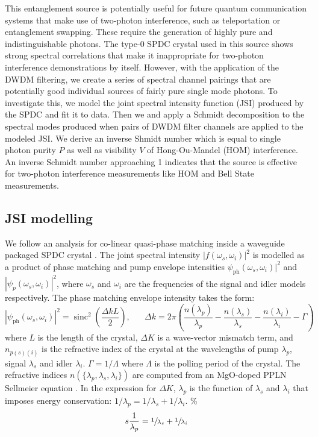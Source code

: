 \documentclass[11pt]{caltech_thesis} %
\begin{document}
This entanglement source is potentially useful for future quantum communication systems that make use of two-photon interference, such as teleportation or entanglement swapping. These require the generation of highly pure and indistinguishable photons. The type-0 SPDC crystal used in this source shows strong spectral correlations that make it inappropriate for two-photon interference demonstrations by itself. However, with the application of the DWDM filtering, we create a series of spectral channel pairings that are potentially good individual sources of fairly pure single mode photons. To investigate this, we model the joint spectral intensity function (JSI) produced by the SPDC and fit it to data. Then we and apply a Schmidt decomposition to the spectral modes produced when pairs of DWDM filter channels are applied to the modeled JSI. We derive an inverse Shmidt number which is equal to single photon purity $P$ as well as visibility $V$ of Hong-Ou-Mandel (HOM) interference. An inverse Schmidt number approaching 1 indicates that the source is effective for two-photon interference measurements like HOM and Bell State measurements.

\hypertarget{jsi-modelling}{%
\subsection{JSI modelling}\label{jsi-modelling}}

We follow an analysis for co-linear quasi-phase matching inside a waveguide packaged SPDC crystal \cite{Davis2022, ZielnickiKwiat2018SPDCmodel}. The joint spectral intensity $|f(\omega_s, \omega_i)|^2$ is modelled as a product of phase matching and pump envelope intensities \textbar{}$\psi_{\mathrm{ph}}\left(\omega_s, \omega_i\right)|^2$ and $|\psi_p\left(\omega_s, \omega_i\right)|^2$, where $\omega_s$ and $\omega_i$ are the frequencies of the signal and idler models respectively. The phase matching envelope intensity takes the form:
$$\left|\psi_{\mathrm{ph}}\left(\omega_s, \omega_i\right)\right|^2=\operatorname{sinc}^2\left(\frac{\Delta k L}{2}\right),\;\;\;\;\;\; \Delta k=2 \pi\left(\frac{n\left(\lambda_p\right)}{\lambda_p}-\frac{n\left(\lambda_s\right)}{\lambda_s}-\frac{n\left(\lambda_i\right)}{\lambda_i}-\Gamma\right)$$
where $L$ is the length of the crystal, $\Delta K$ is a wave-vector mismatch term, and $n_{p(s)(i)}$ is the refractive index of the crystal at the wavelengths of pump $\lambda_p$, signal $\lambda_s$ and idler $\lambda_i$. $\Gamma = 1/\Lambda$ where $\Lambda$ is the polling period of the crystal. The refractive indices $n(\{\lambda_p, \lambda_s, \lambda_i\})$ are computed from an MgO-doped PPLN Sellmeier equation \cite{Gayer2008}. In the expression for $\Delta K$, $\lambda_p$ is the function of $\lambda_s$ and $\lambda_i$ that imposes energy conservation: $1/\lambda_p = 1/\lambda_s + 1/\lambda_i$.
\% $$s\frac{1}{\lambda_p} = \sfrac{1}{\lambda_s} + \sfrac{1}{\lambda_i}$$
\end{document}
